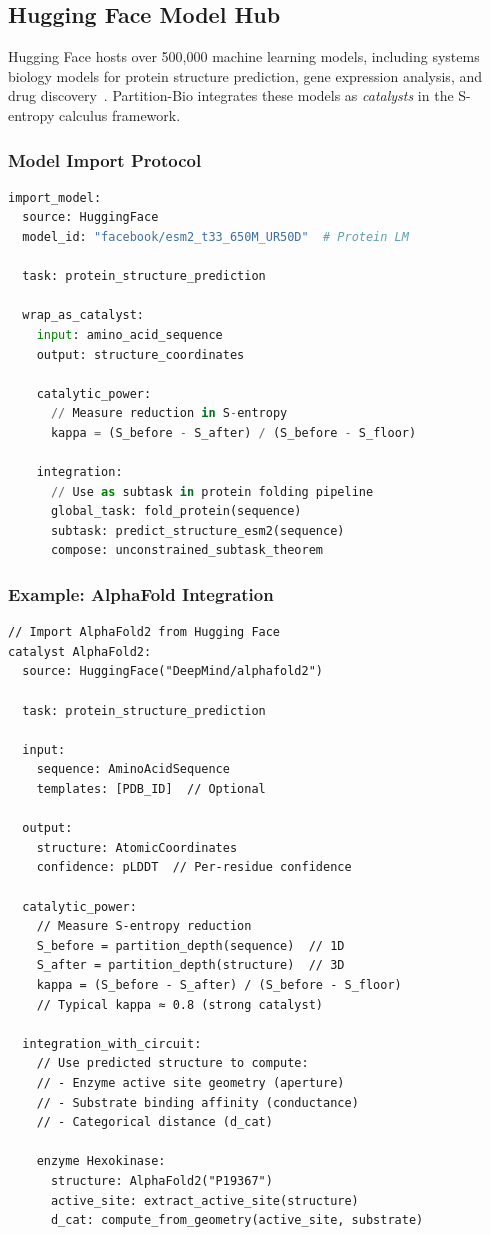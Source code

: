 \documentclass[12pt,a4paper]{article}
\begin{document}
\subsection{Hugging Face Model Hub}

Hugging Face hosts over 500,000 machine learning models, including systems biology models for protein structure prediction, gene expression analysis, and drug discovery~\cite{huggingface2024}. Partition-Bio integrates these models as \textit{catalysts} in the S-entropy calculus framework.

\subsubsection{Model Import Protocol}

\begin{lstlisting}[language=Python, basicstyle=\ttfamily\small]
import_model:
  source: HuggingFace
  model_id: "facebook/esm2_t33_650M_UR50D"  # Protein LM
  
  task: protein_structure_prediction
  
  wrap_as_catalyst:
    input: amino_acid_sequence
    output: structure_coordinates
    
    catalytic_power:
      // Measure reduction in S-entropy
      kappa = (S_before - S_after) / (S_before - S_floor)
      
    integration:
      // Use as subtask in protein folding pipeline
      global_task: fold_protein(sequence)
      subtask: predict_structure_esm2(sequence)
      compose: unconstrained_subtask_theorem
\end{lstlisting}

\subsubsection{Example: AlphaFold Integration}

\begin{lstlisting}[basicstyle=\ttfamily\small]
// Import AlphaFold2 from Hugging Face
catalyst AlphaFold2:
  source: HuggingFace("DeepMind/alphafold2")
  
  task: protein_structure_prediction
  
  input:
    sequence: AminoAcidSequence
    templates: [PDB_ID]  // Optional
  
  output:
    structure: AtomicCoordinates
    confidence: pLDDT  // Per-residue confidence
  
  catalytic_power:
    // Measure S-entropy reduction
    S_before = partition_depth(sequence)  // 1D
    S_after = partition_depth(structure)  // 3D
    kappa = (S_before - S_after) / (S_before - S_floor)
    // Typical kappa ≈ 0.8 (strong catalyst)
  
  integration_with_circuit:
    // Use predicted structure to compute:
    // - Enzyme active site geometry (aperture)
    // - Substrate binding affinity (conductance)
    // - Categorical distance (d_cat)
    
    enzyme Hexokinase:
      structure: AlphaFold2("P19367")
      active_site: extract_active_site(structure)
      d_cat: compute_from_geometry(active_site, substrate)
\end{lstlisting}
\end{document}
